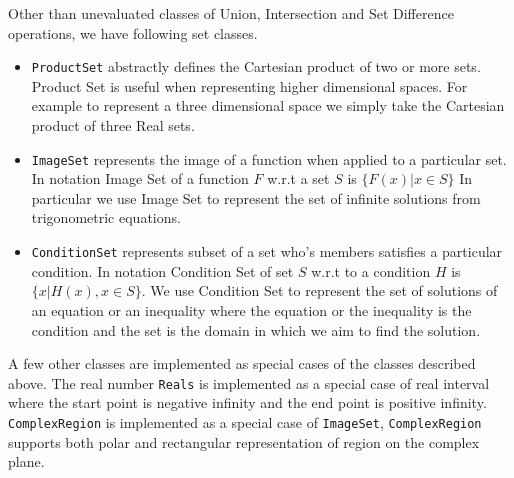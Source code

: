 
Other than unevaluated classes of Union, Intersection and Set Difference
operations, we have following set classes.

\begin{itemize}

    \item \verb|ProductSet| abstractly defines the Cartesian product of two
        or more sets. Product Set is useful when representing higher
        dimensional spaces. For example to represent a three dimensional space
        we simply take the Cartesian product of three Real sets.

    \item \verb|ImageSet| represents the image of a function when applied to a
        particular set. In notation Image Set of a function $F$ w.r.t a set $S$
        is $\{ F(x) | x \in S \}$ In particular we use Image Set to represent
        the set of infinite solutions from trigonometric equations.


    \item \verb|ConditionSet| represents subset of a set who's members
        satisfies a particular condition. In notation Condition Set of set $S$
        w.r.t to a condition $H$ is $\{x | H(x), x \in S \}$. We use Condition Set
        to represent the set of solutions of an equation or an inequality where
        the equation or the inequality is the condition and the set is the
        domain in which we aim to find the solution.


\end{itemize}

A few other classes are implemented as special cases of the classes described
above. The real number \verb|Reals| is implemented as a special case of real
interval where the start point is negative infinity and the end point is
positive infinity. \verb|ComplexRegion| is implemented as a special case of
\verb|ImageSet|, \verb|ComplexRegion| supports both polar and rectangular
representation of region on the complex plane.
